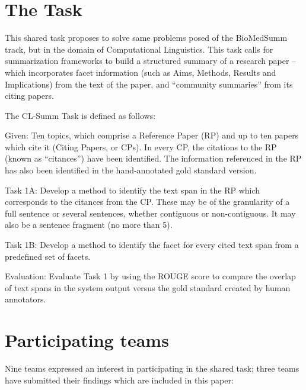 \documentclass[11pt]{article}
\begin{document}
\section{The Task}
This shared task proposes to solve same problems posed of the
BioMedSumm track, but in the domain of Computational Linguistics. This
task calls for summarization frameworks to build a structured summary
of a research paper -- which incorporates facet information (such as
Aims, Methods, Results and Implications) from the text of the paper,
and ``community summaries'' from its citing papers.

The CL-Summ Task is defined as follows:

Given: Ten topics, which comprise a Reference Paper (RP) and up to ten papers 
which cite it (Citing Papers, or CPs). In every CP, the citations to the RP 
(known as ``citances'') have been identified. The information referenced in 
the RP has also been identified in the hand-annotated gold standard version.

Task 1A: Develop a method to identify the text span in the RP which corresponds 
to the citances from the CP. These may be of the granularity of a full sentence 
or several sentences, whether contiguous or non-contiguous. It may also be a 
sentence fragment (no more than 5).

Task 1B: Develop a method to identify the facet for every cited text span from 
a predefined set of facets.

Evaluation: Evaluate Task 1 by using the ROUGE score to compare the overlap of 
text spans in the system output versus the gold standard created by human 
annotators.

\section{Participating teams}
Nine teams expressed an interest in participating in the shared task;
three teams have submitted their findings which are included in this
paper:
\end{document}
